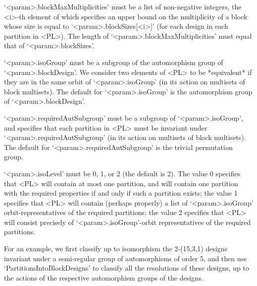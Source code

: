 `<param>.blockMaxMultiplicities' must be a list of non-negative
integers, the <i>-th element of which specifies an upper bound on the
multiplicity of a block whose size is equal to `<param>.blockSizes[<i>]'
(for each design in each partition in <PL>). The length of
`<param>.blockMaxMultiplicities' must equal that of `<param>.blockSizes'.

`<param>.isoGroup' must be a subgroup of the automorphism group of
`<param>.blockDesign'. We consider two elements of <PL> to be
*equivalent* if they are in the same orbit of `<param>.isoGroup'
(in its action on multisets of block multisets).  The default for
`<param>.isoGroup' is the automorphism group of `<param>.blockDesign'.

`<param>.requiredAutSubgroup' must be a subgroup of `<param>.isoGroup',
and specifies that each partition in <PL> must be invariant under
`<param>.requiredAutSubgroup' (in its action on multisets of block
multisets). The default for `<param>.requiredAutSubgroup' is the trivial
permutation group.

`<param>.isoLevel' must be 0, 1, or 2 (the default is 2).  The value 0
specifies that <PL> will contain at most one partition, and will contain
one partition with the required properties if and only if such a partition
exists; the value 1 specifies that <PL> will contain (perhaps properly)
a list of `<param>.isoGroup' orbit-representatives of the required
partitions; the value 2 specifies that <PL> will consist precisely of
`<param>.isoGroup'-orbit representatives of the required partitions.

For an example, we first classify up to isomorphism the 2-(15,3,1)
designs invariant under a semi-regular group of automorphisms of order 5,
and then use `PartitionsIntoBlockDesigns' to classify all the resolutions
of these designs, up to the actions of the respective automorphism groups
of the designs.

